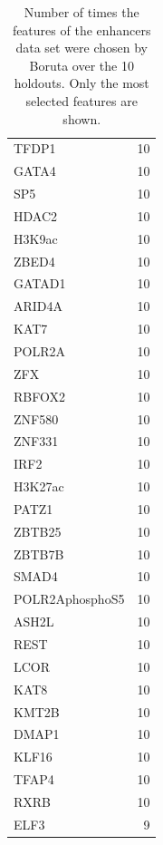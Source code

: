 \documentclass{article}
\begin{document}
\begin{table}
{\begin{tabular}{lr}
        TFDP1           &     10 \\
        GATA4           &     10 \\
        SP5             &     10 \\
        HDAC2           &     10 \\
        H3K9ac          &     10 \\
        ZBED4           &     10 \\
        GATAD1          &     10 \\
        ARID4A          &     10 \\
        KAT7            &     10 \\
        POLR2A          &     10 \\
        ZFX             &     10 \\
        RBFOX2          &     10 \\
        ZNF580          &     10 \\
        ZNF331          &     10 \\
        IRF2            &     10 \\
        H3K27ac         &     10 \\
        PATZ1           &     10 \\
        ZBTB25          &     10 \\
        ZBTB7B          &     10 \\
        SMAD4           &     10 \\
        POLR2AphosphoS5 &     10 \\
        ASH2L           &     10 \\
        REST            &     10 \\
        LCOR            &     10 \\
        KAT8            &     10 \\
        KMT2B           &     10 \\
        DMAP1           &     10 \\
        KLF16           &     10 \\
        TFAP4           &     10 \\
        RXRB            &     10 \\
        ELF3            &      9 \\
    \bottomrule
    \end{tabular}
    }
    \caption{Number of times the features of the enhancers data set were chosen by Boruta over the 10 holdouts. Only the most selected features are shown.}
    \label{tab:res:enh_features}
\end{table}
\end{document}
